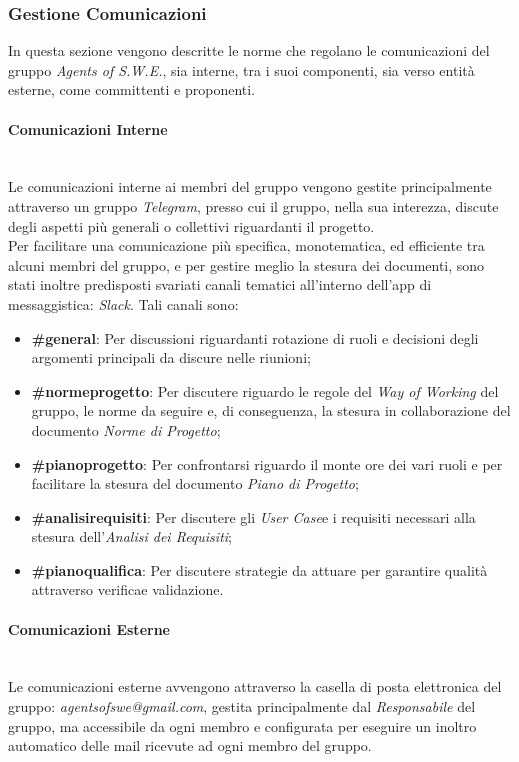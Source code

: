 \subsubsection{Gestione Comunicazioni}
	In questa sezione vengono descritte le norme che regolano le comunicazioni del gruppo \textit{Agents of S.W.E.}, 		sia interne, tra i suoi componenti, sia verso entità esterne, come committenti e proponenti.

\paragraph{Comunicazioni Interne} ~\\
	Le comunicazioni interne ai membri del gruppo vengono gestite principalmente attraverso un gruppo 										\textit{Telegram}\glossario, presso cui il gruppo, nella sua interezza, discute degli aspetti più generali o 				collettivi riguardanti il progetto. \\
	Per facilitare una comunicazione più specifica, monotematica, ed efficiente tra alcuni membri del gruppo, e per 			gestire meglio la stesura dei documenti, sono stati inoltre predisposti svariati canali tematici all'interno 				dell'app di messaggistica: \textit{Slack}\glossario. Tali canali sono:
	\begin{itemize}
	\item \textbf{\#general}: Per discussioni riguardanti rotazione di ruoli e decisioni degli argomenti principali 				da discure nelle riunioni;
	\item \textbf{\#normeprogetto}: Per discutere riguardo le regole del \textit{Way of Working} del gruppo, le norme 		da seguire e, di conseguenza, la stesura in collaborazione del documento \textit{Norme di Progetto}\glossario;
	\item \textbf{\#pianoprogetto}: Per confrontarsi riguardo il monte ore dei vari ruoli e per facilitare la stesura 		del documento \textit{Piano di Progetto}\glossario;
	\item \textbf{\#analisirequisiti}: Per discutere gli \textit{User Case}\glossario e i requisiti necessari alla 				stesura dell'\textit{Analisi dei Requisiti};
	\item \textbf{\#pianoqualifica}: Per discutere strategie da attuare per garantire qualità attraverso 									verifica\glossario e validazione\glossario.
	\end{itemize}

\paragraph{Comunicazioni Esterne} ~\\
	Le comunicazioni esterne avvengono attraverso la casella di posta elettronica del gruppo: 														\textit{agentsofswe@gmail.com}, gestita principalmente dal \textit{Responsabile} del gruppo, ma accessibile da 			ogni membro e configurata per eseguire un inoltro automatico delle mail ricevute ad ogni membro del gruppo.


